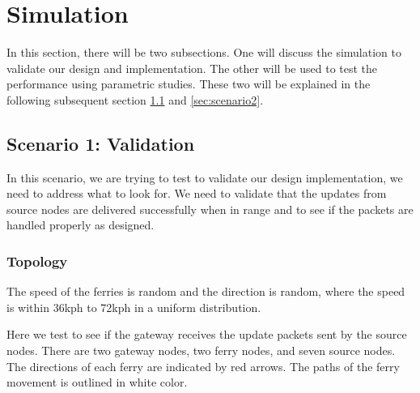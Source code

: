 \chapter{Simulation} 

In this section, there will be two subsections.  One will discuss the simulation to validate our design and implementation.  The other will be used to test the performance using parametric studies.  These two will be explained in the following subsequent section \ref{sec:scenario1} and \ref{sec:scenario2}.



\section{Scenario 1: Validation}
\label{sec:scenario1}

In this scenario, we are trying to test to validate our design implementation, we need to address what to look for.  
We need to validate that the updates from source nodes are delivered successfully when in range and to see if the packets are handled properly as designed.  

\subsection{Topology}

The speed of the ferries is random and the direction is random, where the speed is within 36kph to 72kph in a uniform distribution.  


Here we test to see if the gateway receives the update packets sent by the source nodes.  
There are two gateway nodes, two ferry nodes, and seven source nodes.  
The directions of each ferry are indicated by red arrows.
The paths of the ferry movement is outlined in white color.

